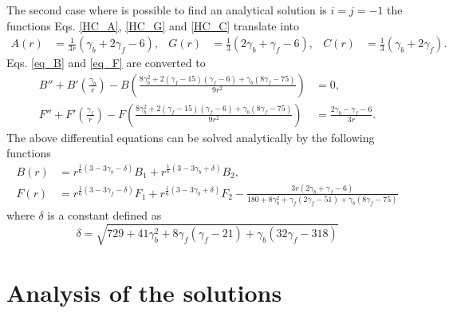 \documentclass{article}
\begin{document}
The second case where is possible to find an analytical solution is $i = j = -1$
the functions Eqs. \eqref{HC_A}, \eqref{HC_G}
and \eqref{HC_C} translate into 
\begin{align}
    A(r) & = \frac{1}{3r}\left(\gamma_b + 2\gamma_f - 6\right), & 
    G(r) & = \frac{1}{3}\left(2\gamma_b + \gamma_f - 6\right), &
    C(r) & = \frac{1}{3}\left(\gamma_b + 2\gamma_f\right).
\end{align}
Eqs. \eqref{eq_B} and \eqref{eq_F} are converted to
\begin{align}
    B'' + B'\left(\frac{\gamma_b}{r}\right) - B\left(\frac{8\gamma_b^2 + 2\left(\gamma_f - 15\right)\left(\gamma_f - 6\right) + \gamma_b\left(8\gamma_f - 75\right)}{9r^2}\right) & = 0, \\
    F'' + F'\left(\frac{\gamma_f}{r}\right) - F\left(\frac{8\gamma_b^2 + 2\left(\gamma_f - 15\right)\left(\gamma_f - 6\right) + \gamma_b\left(8\gamma_f - 75\right)}{9r^2}\right) & = \frac{2\gamma_b - \gamma_f - 6}{3r}.
\end{align}
The above differential equations can be solved analytically by the following functions
\begin{align}
    B(r) & = r^{\frac{1}{6}\left(3 - 3\gamma_b - \delta\right)}B_1 + r^{\frac{1}{6}\left(3 - 3\gamma_b + \delta\right)}B_2 ,\\
    F(r) & = r^{\frac{1}{6}\left(3 - 3\gamma_f - \delta\right)}F_1 + r^{\frac{1}{6}\left(3 - 3\gamma_b + \delta\right)}F_2 - \frac{3r\left(2\gamma_b + \gamma_f - 6\right)}{180 + 8\gamma_b^2 + \gamma_f\left(2\gamma_f -51\right) + \gamma_b\left(8\gamma_f - 75\right)} 
\end{align}
where $\delta$ is a constant defined as
\begin{equation}
    \delta = \sqrt{729 + 41\gamma_b^2 + 8\gamma_f\left(\gamma_f - 21\right) + \gamma_b\left(32\gamma_f - 318\right)}
\end{equation}



\section{Analysis of the solutions}
\end{document}
